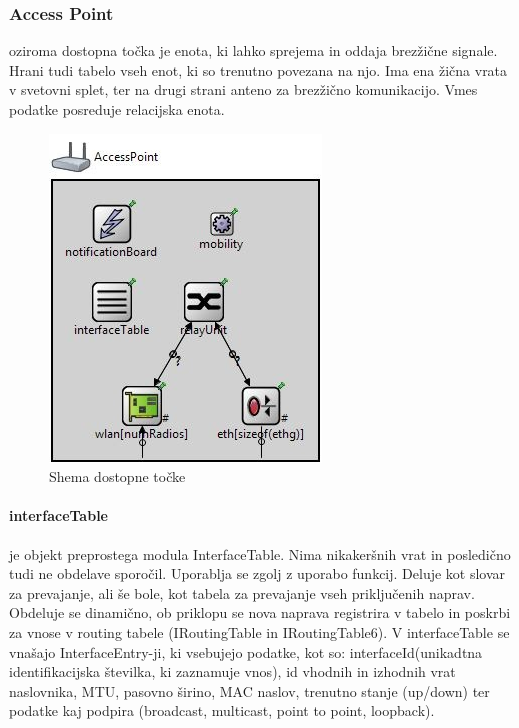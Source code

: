 \documentclass[a4paper,11pt]{article}
\begin{document}
\subsubsection{Access Point}
\label{description:acceesspoint}

oziroma dostopna točka je enota, ki lahko sprejema in oddaja brezžične signale. Hrani tudi tabelo vseh enot, ki so trenutno povezana na njo. Ima ena žična vrata v svetovni splet, ter na drugi strani anteno za brezžično komunikacijo. Vmes podatke posreduje relacijska enota. 

\begin{figure}[htbp]
    \begin{center}
        \includegraphics[scale=0.8]{img/ap.jpg}
        \caption{Shema dostopne točke}
	\label{image:ap}
    \end{center}
\end{figure}


\paragraph{interfaceTable}
\label{description:interfaceTable}

je objekt preprostega modula InterfaceTable. Nima nikakeršnih vrat in posledično tudi ne obdelave sporočil. Uporablja se zgolj z uporabo funkcij. Deluje kot slovar za prevajanje, ali še bole, kot tabela za prevajanje vseh priključenih naprav. Obdeluje se dinamično, ob priklopu se nova naprava registrira v tabelo in poskrbi za vnose v routing tabele (IRoutingTable in IRoutingTable6). V interfaceTable se vnašajo InterfaceEntry-ji, ki vsebujejo podatke, kot so: interfaceId(unikadtna identifikacijska številka, ki zaznamuje vnos), id vhodnih in izhodnih vrat naslovnika, MTU, pasovno širino, MAC naslov, trenutno stanje (up/down) ter podatke kaj podpira (broadcast, multicast, point to point, loopback).
\end{document}
